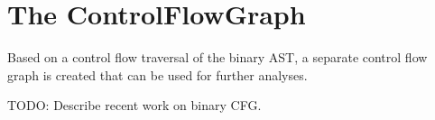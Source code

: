





\section{The ControlFlowGraph}

Based on a control flow traversal of the binary AST, a separate control flow graph
is created that can be used for further analyses.

TODO: Describe recent work on binary CFG.





